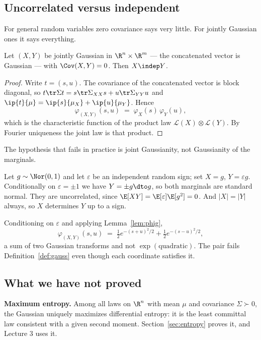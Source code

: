 \documentclass[11pt]{article}
\begin{document}
\subsection{Uncorrelated versus independent}

For general random variables zero covariance says very little. For jointly Gaussian ones it says everything.

\begin{theorem}\label{thm:indep}
Let $(X,Y)$ be jointly Gaussian in $\R^n\times\R^m$ --- the concatenated vector is Gaussian --- with $\Cov(X,Y)=0$. Then $X\indep Y$.
\end{theorem}

\begin{proof}
Write $t=(s,u)$. The covariance of the concatenated vector is block diagonal, so $t\tr\Sigma t=s\tr\Sigma_{XX}s+u\tr\Sigma_{YY}u$ and $\ip{t}{\mu}=\ip{s}{\mu_X}+\ip{u}{\mu_Y}$. Hence
\[
\varphi_{(X,Y)}(s,u)\;=\;\varphi_X(s)\,\varphi_Y(u),
\]
which is the characteristic function of the product law $\mathcal{L}(X)\otimes\mathcal{L}(Y)$. By Fourier uniqueness the joint law is that product.
\end{proof}

The hypothesis that fails in practice is joint Gaussianity, not Gaussianity of the marginals.

\begin{example}\label{ex:fail}
Let $g\sim\Nor(0,1)$ and let $\varepsilon$ be an independent random sign; set $X=g$, $Y=\varepsilon g$. Conditionally on $\varepsilon=\pm1$ we have $Y=\pm g\dto g$, so both marginals are standard normal. They are uncorrelated, since $\E[XY]=\E[\varepsilon]\E[g^2]=0$. And $|X|=|Y|$ always, so $X$ determines $Y$ up to a sign.

Conditioning on $\varepsilon$ and applying Lemma~\ref{lem:phig},
\[
\varphi_{(X,Y)}(s,u)\;=\;\tfrac12 e^{-(s+u)^2/2}+\tfrac12 e^{-(s-u)^2/2},
\]
a sum of two Gaussian transforms and not $\exp(\text{quadratic})$. The pair fails Definition~\ref{def:gauss} even though each coordinate satisfies it.
\end{example}

\subsection{What we have not proved}

\textbf{Maximum entropy.} Among all laws on $\R^n$ with mean $\mu$ and covariance $\Sigma\succ0$, the Gaussian uniquely maximizes differential entropy: it is the least committal law consistent with a given second moment. Section~\ref{sec:entropy} proves it, and Lecture 3 uses it.
\end{document}
